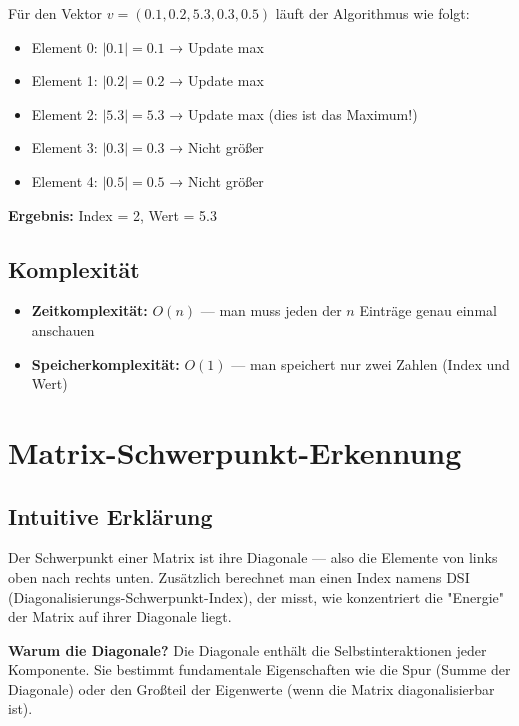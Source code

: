 \documentclass[a4paper,12pt]{article}
\begin{document}
Für den Vektor $v = (0.1, 0.2, 5.3, 0.3, 0.5)$ läuft der Algorithmus wie folgt:
\begin{itemize}
\item Element 0: $|0.1| = 0.1$ → Update max
\item Element 1: $|0.2| = 0.2$ → Update max
\item Element 2: $|5.3| = 5.3$ → Update max (dies ist das Maximum!)
\item Element 3: $|0.3| = 0.3$ → Nicht größer
\item Element 4: $|0.5| = 0.5$ → Nicht größer
\end{itemize}

\textbf{Ergebnis:} Index = 2, Wert = 5.3

\subsection{Komplexität}

\begin{itemize}
\item \textbf{Zeitkomplexität:} $O(n)$ — man muss jeden der $n$ Einträge genau einmal anschauen
\item \textbf{Speicherkomplexität:} $O(1)$ — man speichert nur zwei Zahlen (Index und Wert)
\end{itemize}


\section{Matrix-Schwerpunkt-Erkennung}

\subsection{Intuitive Erklärung}

Der Schwerpunkt einer Matrix ist ihre Diagonale — also die Elemente von links oben nach rechts unten. Zusätzlich berechnet man einen Index namens DSI (Diagonalisierungs-Schwerpunkt-Index), der misst, wie konzentriert die "Energie" der Matrix auf ihrer Diagonale liegt.

\textbf{Warum die Diagonale?} Die Diagonale enthält die Selbstinteraktionen jeder Komponente. Sie bestimmt fundamentale Eigenschaften wie die Spur (Summe der Diagonale) oder den Großteil der Eigenwerte (wenn die Matrix diagonalisierbar ist).
\end{document}
